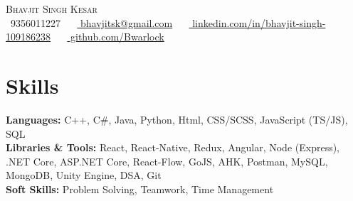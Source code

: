 \documentclass[letterpaper,11pt]{article}
\begin{document}


\begin{center}
    {\Huge \scshape Bhavjit Singh Kesar} \\ \vspace{1pt}
    \vspace{5pt}
    \small \raisebox{-0.1\height}\faPhone\ 9356011227 ~ 
    \raisebox{-0.2\height}\faEnvelope\ \href{mailto:bhavjitsk@gmail.com}{ bhavjitsk@gmail.com} ~ 
    \raisebox{-0.2\height}\faLinkedin\ \href{https://www.linkedin.com/in/bhavjit-singh-109186238}{ linkedin.com/in/bhavjit-singh-109186238}  ~
    \raisebox{-0.2\height}\faGithub\ \href{https://github.com/Bwarlock}{ github.com/Bwarlock}
    \vspace{-8pt}
\end{center}

\section{Skills}
 \begin{itemize}[leftmargin=0.15in, label={}]
    {\item{
     \textbf{Languages:}{ C++, C\#, Java, Python, Html, CSS/SCSS, JavaScript (TS/JS), SQL} \\
     \vspace{1pt}
     \textbf{Libraries \& Tools:}{ React, React-Native, Redux, Angular, Node (Express), .NET Core, ASP.NET Core, React-Flow, GoJS, AHK, Postman, MySQL, MongoDB, Unity Engine, DSA, Git} \\
     \vspace{1pt}
     \textbf{Soft Skills:}{ Problem Solving, Teamwork, Time Management} \\
    }}
 \end{itemize}
 \vspace{-16pt}
\end{document}
